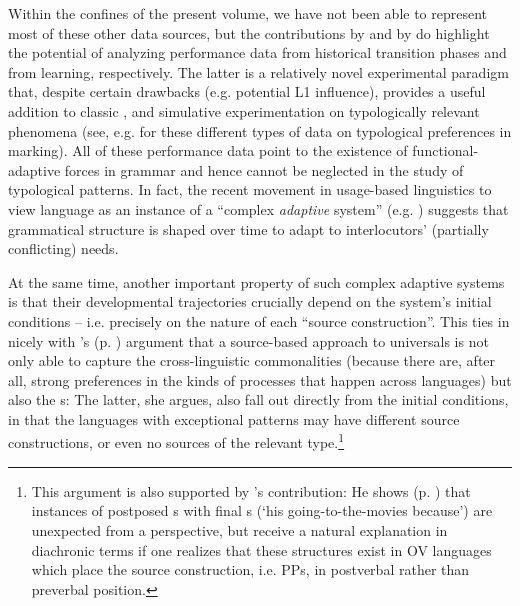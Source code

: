 \documentclass[output=paper]{langsci/langscibook}
\begin{document}
Within the confines of the present volume, we have not been able to represent most of these other data sources, but the contributions by  and by  do highlight the potential of analyzing performance data from historical transition phases and from  learning, respectively. The latter is a relatively novel experimental paradigm that, despite certain drawbacks (e.g. potential L1 influence), provides a useful addition to classic ,  and simulative experimentation on typologically relevant phenomena (see, e.g. \citealt{KurumadaJaeger2015,BickelEtAl2015,Lestrade2018} for these different types of data on typological preferences in  marking). All of these performance data point to the existence of functional-adaptive forces in grammar and hence cannot be neglected in the study of typological patterns. In fact, the recent movement in usage-based linguistics to view language as an instance of a “complex \textit{adaptive} system” (e.g. \citealt{Gell-Mann1992,BecknerEtAl2009}) suggests that grammatical structure is shaped over time to adapt to interlocutors’ (partially conflicting) needs. 

At the same time, another important property of such complex adaptive systems is that their developmental trajectories crucially depend on the system’s initial conditions – i.e. precisely on the nature of each “source construction”. This ties in nicely with ’s (p. \pageref{p:cristofaro:commonalitiesexceptions}) argument that a source-based approach to universals is not only able to capture the cross-linguistic commonalities (because there are, after all, strong preferences in the kinds of  processes that happen across languages) but also the s: The latter, she argues, also fall out directly from the initial conditions, in that the languages with exceptional patterns may have different source constructions, or even no sources of the relevant type.\footnote{This argument is also supported by ’s contribution: He shows (p. \pageref{p:diessel:exception}) that instances of postposed s with final s (‘his going-to-the-movies because’) are unexpected from a  perspective, but receive a natural explanation in diachronic terms if one realizes that these structures exist in OV languages which place the source construction, i.e.  PPs, in postverbal rather than preverbal position.}  
\end{document}
